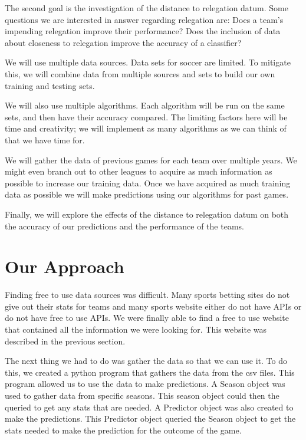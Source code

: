 \documentclass[conference]{IEEEtran}
\begin{document}
The second goal is the investigation of the distance to relegation datum. Some questions we are interested in answer regarding relegation are:
Does a team's impending relegation improve their performance?
Does the inclusion of data about closeness to relegation improve the accuracy of a classifier?

We will use multiple data sources. Data sets for soccer are limited. To mitigate this, we will combine data from multiple sources and sets to build our own training and testing sets.

We will also use multiple algorithms. Each algorithm will be run on the same sets, and then have their accuracy compared.  The limiting factors here will be time and creativity; we will implement as many algorithms as we can think of that we have time for.

We will gather the data of previous games for each team over multiple years. We might even branch out to other leagues to acquire as much information as possible to increase our training data. Once we have acquired as much training data as possible we will make predictions using our algorithms for past games.

Finally, we will explore the effects of the distance to relegation datum on both the accuracy of our predictions and the performance of the teams.
\section{Our Approach}
Finding free to use data sources was difficult. Many sports betting sites do not give out their stats for teams and many sports website either do not have APIs or do not have free to use APIs. We were finally able to find a free to use website that contained all the information we were looking for. This website was described in the previous section.

The next thing we had to do was gather the data so that we can use it. To do this, we created a python program that gathers the data from the csv files. This program allowed us to use the data to make predictions. A Season object was used to gather data from specific seasons. This season object could then the queried to get any stats that are needed. A Predictor object was also created to make the predictions. This Predictor object queried the Season object to get the stats needed to make the prediction for the outcome of the game.
\end{document}
